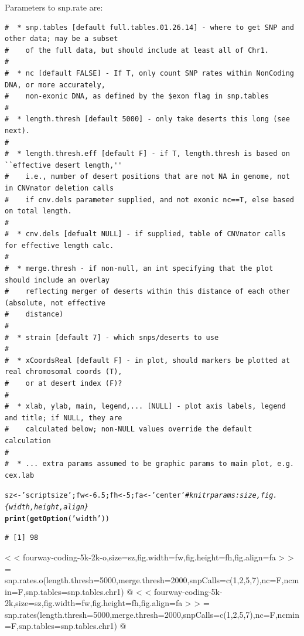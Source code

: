 \documentclass{article}\usepackage[]{graphicx}\usepackage[]{color}
\makeatletter
\newcommand{\hlnum}[1]{\textcolor[rgb]{0.686,0.059,0.569}{#1}}%
\newcommand{\hlstr}[1]{\textcolor[rgb]{0.192,0.494,0.8}{#1}}%
\newcommand{\hlcom}[1]{\textcolor[rgb]{0.678,0.584,0.686}{\textit{#1}}}%
\newcommand{\hlstd}[1]{\textcolor[rgb]{0.345,0.345,0.345}{#1}}%
\newcommand{\hlkwb}[1]{\textcolor[rgb]{0.69,0.353,0.396}{#1}}%
\newcommand{\hlkwd}[1]{\textcolor[rgb]{0.737,0.353,0.396}{\textbf{#1}}}%
\newenvironment{kframe}{%
 \def\at@end@of@kframe{}%
 \ifinner\ifhmode%
  \def\at@end@of@kframe{\end{minipage}}%
  \begin{minipage}{\columnwidth}%
 \fi\fi%
 \def\FrameCommand##1{\hskip\@totalleftmargin \hskip-\fboxsep
 \colorbox{shadecolor}{##1}\hskip-\fboxsep
     \hskip-\linewidth \hskip-\@totalleftmargin \hskip\columnwidth}%
 \MakeFramed {\advance\hsize-\width
   \@totalleftmargin\z@ \linewidth\hsize
   \@setminipage}}%
 {\par\unskip\endMakeFramed%
 \at@end@of@kframe}
\newenvironment{knitrout}{}{} %
\makeatother
\begin{document}
\noindent Parameters to snp.rate are:

{\footnotesize\begin{verbatim}
#  * snp.tables [default full.tables.01.26.14] - where to get SNP and other data; may be a subset
#    of the full data, but should include at least all of Chr1.
#
#  * nc [default FALSE] - If T, only count SNP rates within NonCoding DNA, or more accurately,
#    non-exonic DNA, as defined by the $exon flag in snp.tables
#
#  * length.thresh [default 5000] - only take deserts this long (see next).  
#
#  * length.thresh.eff [default F] - if T, length.thresh is based on ``effective desert length,''
#    i.e., number of desert positions that are not NA in genome, not in CNVnator deletion calls
#    if cnv.dels parameter supplied, and not exonic nc==T, else based on total length.
#
#  * cnv.dels [defualt NULL] - if supplied, table of CNVnator calls for effective length calc.
#
#  * merge.thresh - if non-null, an int specifying that the plot should include an overlay
#    reflecting merger of deserts within this distance of each other (absolute, not effective 
#    distance)
#
#  * strain [default 7] - which snps/deserts to use
#
#  * xCoordsReal [default F] - in plot, should markers be plotted at real chromosomal coords (T),
#    or at desert index (F)?
#
#  * xlab, ylab, main, legend,... [NULL] - plot axis labels, legend and title; if NULL, they are
#    calculated below; non-NULL values override the default calculation
#
#  * ... extra params assumed to be graphic params to main plot, e.g. cex.lab
\end{verbatim}}


\begin{knitrout}\footnotesize
{}\color{fgcolor}\begin{kframe}
\begin{alltt}
\hlstd{sz} \hlkwb{<-} \hlstr{'scriptsize'} \hlstd{; fw} \hlkwb{<-} \hlnum{6.5} \hlstd{; fh} \hlkwb{<-} \hlnum{5} \hlstd{; fa} \hlkwb{<-} \hlstr{'center'} \hlcom{# knitr params: size, fig.\{width,height,align\}}
\hlkwd{print}\hlstd{(}\hlkwd{getOption}\hlstd{(}\hlstr{'width'}\hlstd{))}
\end{alltt}
\begin{verbatim}
# [1] 98
\end{verbatim}
\end{kframe}
\end{knitrout}
\iffalse
< < fourway-coding-5k-2k-o,size=sz,fig.width=fw,fig.height=fh,fig.align=fa > > =
snp.rates.o(length.thresh=5000,merge.thresh=2000,snpCalls=c(1,2,5,7),nc=F,ncmin=F,snp.tables=snp.tables.chr1)
@
< < fourway-coding-5k-2k,size=sz,fig.width=fw,fig.height=fh,fig.align=fa > > =
snp.rates(length.thresh=5000,merge.thresh=2000,snpCalls=c(1,2,5,7),nc=F,ncmin=F,snp.tables=snp.tables.chr1)
@
\end{document}
